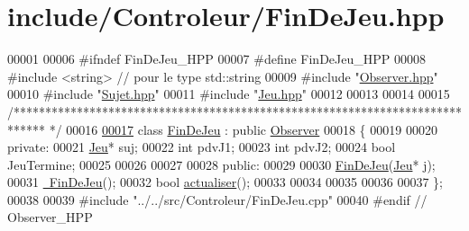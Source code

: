 \hypertarget{_fin_de_jeu_8hpp_source}{\section{include/\-Controleur/\-Fin\-De\-Jeu.hpp}
}

\begin{DoxyCode}
00001 
00006 \textcolor{preprocessor}{#ifndef FinDeJeu\_HPP}
00007 \textcolor{preprocessor}{}\textcolor{preprocessor}{#define FinDeJeu\_HPP}
00008 \textcolor{preprocessor}{}\textcolor{preprocessor}{#include <string>} \textcolor{comment}{// pour le type std::string}
00009 \textcolor{preprocessor}{#include "\hyperlink{_observer_8hpp}{Observer.hpp}"}
00010 \textcolor{preprocessor}{#include "\hyperlink{_sujet_8hpp}{Sujet.hpp}"}
00011 \textcolor{preprocessor}{#include "\hyperlink{_jeu_8hpp}{Jeu.hpp}"}
00012 
00013 
00014 
00015 \textcolor{comment}{/*****************************************************************************
      */}
00016 
\hypertarget{_fin_de_jeu_8hpp_source_l00017}{}\hyperlink{class_fin_de_jeu}{00017} \textcolor{keyword}{class }\hyperlink{class_fin_de_jeu}{FinDeJeu} : \textcolor{keyword}{public} \hyperlink{class_observer}{Observer}
00018 \{
00019 
00020     \textcolor{keyword}{private}:
00021         \hyperlink{class_jeu}{Jeu}* suj;
00022         \textcolor{keywordtype}{int} pdvJ1;
00023         \textcolor{keywordtype}{int} pdvJ2;
00024         \textcolor{keywordtype}{bool} JeuTermine;
00025         
00026         
00027     
00028     \textcolor{keyword}{public}:
00029         
00030         \hyperlink{class_fin_de_jeu_af86c4d468aec3ffb9ed59c02016aadcf}{FinDeJeu}(\hyperlink{class_jeu}{Jeu}* j);
00031         \hyperlink{class_fin_de_jeu_a7f80425c93ed96eadb13ac5e7bb51bd4}{~FinDeJeu}();
00032         \textcolor{keywordtype}{bool} \hyperlink{class_fin_de_jeu_a79c3fb0a9e367cd3e62da14af840f871}{actualiser}();
00033         
00034         
00035         
00036         
00037 \};
00038 
00039 \textcolor{preprocessor}{#include "../../src/Controleur/FinDeJeu.cpp"}
00040 \textcolor{preprocessor}{#endif // Observer\_HPP      }
\end{DoxyCode}
